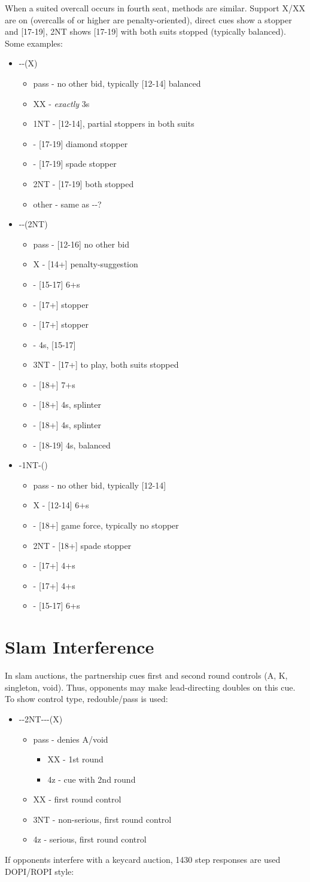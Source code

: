 \documentclass[12pt]{report}
\newcommand{\ul}[1]{\begin{itemize}#1\end{itemize}}
\newcommand{\li}{\item[~]}
\begin{document}
    When a suited overcall occurs in fourth seat, methods are similar.  Support X/XX are on (overcalls of  or higher are penalty-oriented), direct cues show a stopper and [17-19], 2NT shows [17-19] with both suits stopped (typically balanced).  Some examples:

    \ul {
        \li {}--(X)
        \ul {
            \li pass - no other bid, typically [12-14] balanced
            \li XX - \textit{exactly} 3\he{}s
            \li 1NT - [12-14], partial stoppers in both suits
            \li \di2 - [17-19] diamond stopper
            \li \sp2 - [17-19] spade stopper
            \li 2NT - [17-19] both stopped
            \li other - same as \cl1-\he1-?
        }
        \li \cl1-\sp1-(2NT)
        \ul {
            \li pass - [12-16] no other bid
            \li X - [14+] penalty-suggestion
            \li \cl3 - [15-17] 6+\cl{}s
            \li \di3 - [17+] stopper
            \li \he3 - [17+] stopper
            \li \sp3 - 4\sp{}s, [15-17]
            \li 3NT - [17+] to play, both suits stopped
            \li \cl4 - [18+] 7+\cl{}s
            \li \di4 - [18+] 4\sp{}s, splinter
            \li \di4 - [18+] 4\he{}s, splinter
            \li \sp4 - [18-19] 4\sp{}s, balanced
        }
        \li \he1-1NT-(\he2)
        \ul {
            \li pass - no other bid, typically [12-14]
            \li X - [12-14] 6+\he{}s
            \li \sp2 - [18+] game force, typically no stopper
            \li 2NT - [18+] spade stopper
            \li \cl3 - [17+] 4+\cl{}s
            \li \di3 - [17+] 4+\di{}s
            \li \he3 - [15-17] 6+\he{}s
        }
    }
\section{Slam Interference} \label{3:7}

    In slam auctions, the partnership cues first and second round controls (A, K, singleton, void).  Thus, opponents may make lead-directing doubles on this cue.  To show control type, redouble/pass is used:

    \ul {
        \li--2NT---(X)
        \ul {
            \li pass - denies A/void
            \ul {
                \li XX - 1st round
                \li 4z - cue with 2nd round
            }
            \li XX - first round control
            \li 3NT - non-serious, first round control
            \li 4z - serious, first round control
        }
    }

    If opponents interfere with a keycard auction, 1430 step responses are used DOPI/ROPI style:
\end{document}
